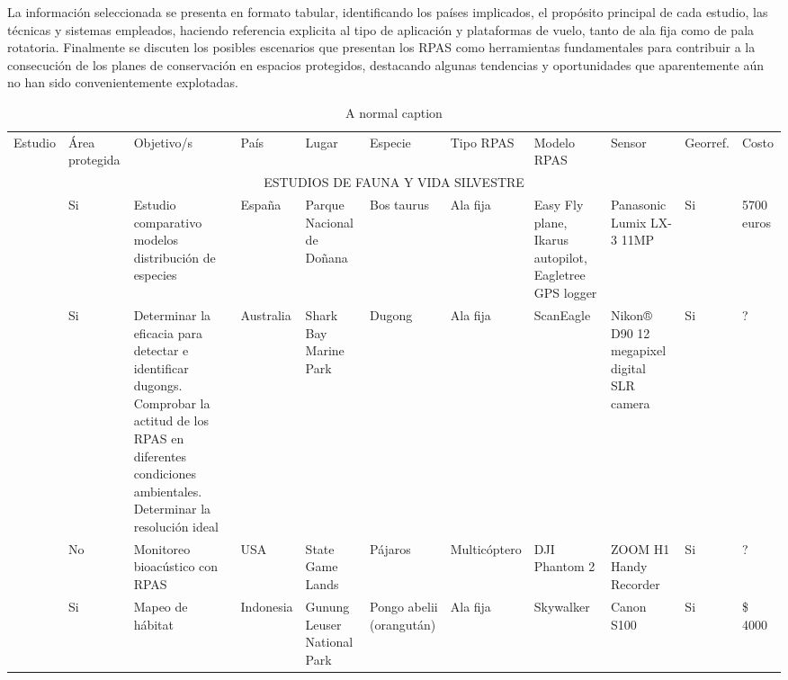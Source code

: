 \documentclass[onecolumn]{extarticle}
\begin{document}
La información seleccionada se presenta en formato tabular,
identificando los países implicados, el propósito principal de cada
estudio, las técnicas y sistemas empleados, haciendo referencia
explicita al tipo de aplicación y plataformas de vuelo, tanto de ala
fija como de pala rotatoria. Finalmente se discuten los posibles
escenarios que presentan los RPAS como herramientas fundamentales para
contribuir a la consecución de los planes de conservación en espacios
protegidos, destacando algunas tendencias y oportunidades que
aparentemente aún no han sido convenientemente explotadas.


\begin{landscape}
\begin{table}
 \caption{A normal caption}
\tiny
\begin{tabular}{p{3cm}p{1.2cm}p{3cm}p{1cm}p{2cm}p{2cm}p{1cm}p{2cm}p{2cm}p{1cm}p{2cm}}

\cmidrule(r){1-11}

Estudio & Área protegida & Objetivo/s & País & Lugar & Especie & Tipo RPAS & Modelo RPAS & Sensor & Georref. & Costo \\ \cmidrule(r){1-11}

\multicolumn{11}{c}{ESTUDIOS DE FAUNA Y VIDA SILVESTRE } \\


\cite{PazmanyMulero2015}  & Si & Estudio comparativo modelos distribución de especies & España & Parque Nacional de Doñana & Bos taurus  & Ala fija & Easy Fly plane, Ikarus autopilot, Eagletree GPS logger & Panasonic Lumix LX-3 11MP & Si & 
5700 euros \\ 

\citealt{Hodgson2013} & Si & Determinar la eficacia para detectar e identificar dugongs.  Comprobar la actitud de los RPAS en diferentes condiciones ambientales. Determinar la resolución ideal  & Australia & Shark Bay Marine Park & Dugong & Ala fija &  ScanEagle & Nikon® D90 12 megapixel digital SLR camera  & Si & ?  \\ 


\cite{Wilson2017}  & No & Monitoreo bioacústico con RPAS & USA & State Game Lands & Pájaros  & Multicóptero & DJI Phantom 2 & ZOOM H1 Handy Recorder  & Si & ? \\ 

\cite{Szantoi2017}  & Si & Mapeo de hábitat & Indonesia & Gunung Leuser National Park & Pongo abelii (orangután)  & Ala fija & Skywalker & Canon S100  & Si & \$ 4000 \\ 



\end{tabular}
\end{table}
\end{landscape}
\end{document}
